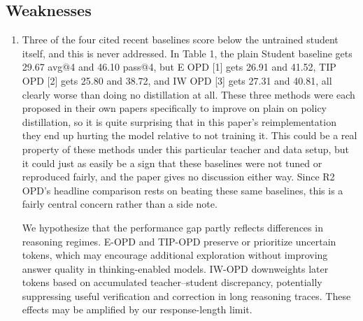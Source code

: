 \documentclass[11pt,a4paper]{article}
\begin{document}
\subsection*{Weaknesses}
\begin{enumerate}
\item[W1] Three of the four cited recent baselines score below the untrained student itself, and this is never addressed. In Table 1, the plain Student baseline gets 29.67 avg@4 and 46.10 pass@4, but E OPD [1] gets 26.91 and 41.52, TIP OPD [2] gets 25.80 and 38.72, and IW OPD [3] gets 27.31 and 40.81, all clearly worse than doing no distillation at all. These three methods were each proposed in their own papers specifically to improve on plain on policy distillation, so it is quite surprising that in this paper's reimplementation they end up hurting the model relative to not training it. This could be a real property of these methods under this particular teacher and data setup, but it could just as easily be a sign that these baselines were not tuned or reproduced fairly, and the paper gives no discussion either way. Since R2 OPD's headline comparison rests on beating these same baselines, this is a fairly central concern rather than a side note.
\par{}
\begin{responsebox}[frametitle={Response to W1}]
We hypothesize that the performance gap partly reflects differences in reasoning regimes. E-OPD and TIP-OPD preserve or prioritize uncertain tokens, which may encourage additional exploration without improving answer quality in thinking-enabled models. IW-OPD downweights later tokens based on accumulated teacher--student discrepancy, potentially suppressing useful verification and correction in long reasoning traces. These effects may be amplified by our response-length limit.
\end{responsebox}


\end{enumerate}
\end{document}
